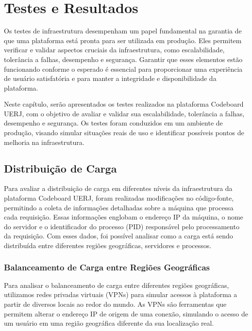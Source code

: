 \chapter{Testes e Resultados}

Os testes de infraestrutura desempenham um papel fundamental na garantia de que uma plataforma está pronta para ser utilizada em produção. Eles permitem verificar e validar aspectos cruciais da infraestrutura, como escalabilidade, tolerância a falhas, desempenho e segurança. Garantir que esses elementos estão funcionando conforme o esperado é essencial para proporcionar uma experiência de usuário satisfatória e para manter a integridade e disponibilidade da plataforma.

Neste capítulo, serão apresentados os testes realizados na plataforma Codeboard UERJ, com o objetivo de avaliar e validar sua escalabilidade, tolerância a falhas, desempenho e segurança. Os testes foram conduzidos em um ambiente de produção, visando simular situações reais de uso e identificar possíveis pontos de melhoria na infraestrutura.

\section{Distribuição de Carga}

Para avaliar a distribuição de carga em diferentes níveis da infraestrutura da plataforma Codeboard UERJ, foram realizadas modificações no código-fonte, permitindo a coleta de informações detalhadas sobre a máquina que processa cada requisição. Essas informações englobam o endereço IP da máquina, o nome do servidor e o identificador do processo (PID) responsável pelo processamento da requisição. Com esses dados, foi possível analisar como a carga está sendo distribuída entre diferentes regiões geográficas, servidores e processos.

\subsection{Balanceamento de Carga entre Regiões Geográficas}

Para analisar o balanceamento de carga entre diferentes regiões geográficas, utilizamos redes privadas virtuais (VPNs) para simular acessos à plataforma a partir de diversos locais ao redor do mundo. As VPNs são ferramentas que permitem alterar o endereço IP de origem de uma conexão, simulando o acesso de um usuário em uma região geográfica diferente da sua localização real.

